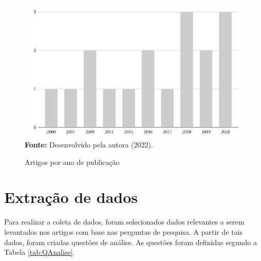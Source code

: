 \documentclass[
    12pt,       %
    openright,      %
    twoside,      %
    a4paper,      %
    english,      %
    french,       %
    spanish,      %
    brazil,       %
    ]{abntex2}
\begin{document}
\begin{figure}[h]
    \centering
    \caption{Artigos por ano de publicação}
    \includegraphics[scale=0.55]{src/tex/img/artigosAno.png} \\
    \label{EstudosRetornados}
    \textbf{Fonte:} Desenvolvido pela autora (2022).
    \centering
\end{figure}

\section{Extração de dados}

Para realizar a coleta de dados, foram selecionados dados relevantes a serem levantados nos artigos com base nas perguntas de pesquisa. A partir de tais dados, foram criadas questões de análise. As questões foram definidas segundo a Tabela \ref{tab:QAnalise}.
\end{document}
